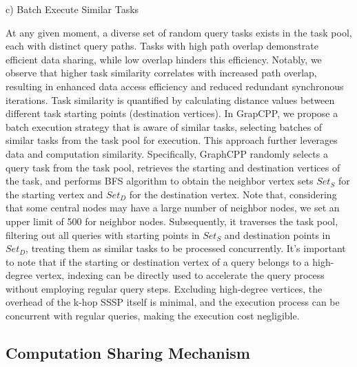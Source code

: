 \documentclass[lettersize,journal]{IEEEtran} %
\begin{document}
c) Batch Execute Similar Tasks

At any given moment, a diverse set of random query tasks exists in the task pool, each with distinct query paths. Tasks with high path overlap demonstrate efficient data sharing, while low overlap hinders this efficiency. Notably, we observe that higher task similarity correlates with increased path overlap, resulting in enhanced data access efficiency and reduced redundant synchronous iterations. Task similarity is quantified by calculating distance values between different task starting points (destination vertices). In GrapCPP, we propose a batch execution strategy that is aware of similar tasks, selecting batches of similar tasks from the task pool for execution. This approach further leverages data and computation similarity. Specifically, GraphCPP randomly selects a query task from the task pool, retrieves the starting and destination vertices of the task, and performs BFS algorithm to obtain the neighbor vertex sets $Set_S$ for the starting vertex and $Set_D$ for the destination vertex. Note that, considering that some central nodes may have a large number of neighbor nodes, we set an upper limit of 500 for neighbor nodes. Subsequently, it traverses the task pool, filtering out all queries with starting points in $Set_S$ and destination points in $Set_D$, treating them as similar tasks to be processed concurrently. It's important to note that if the starting or destination vertex of a query belongs to a high-degree vertex, indexing can be directly used to accelerate the query process without employing regular query steps. Excluding high-degree vertices, the overhead of the k-hop SSSP itself is minimal, and the execution process can be concurrent with regular queries, making the execution cost negligible.


\subsection{Computation Sharing Mechanism}
\end{document}
